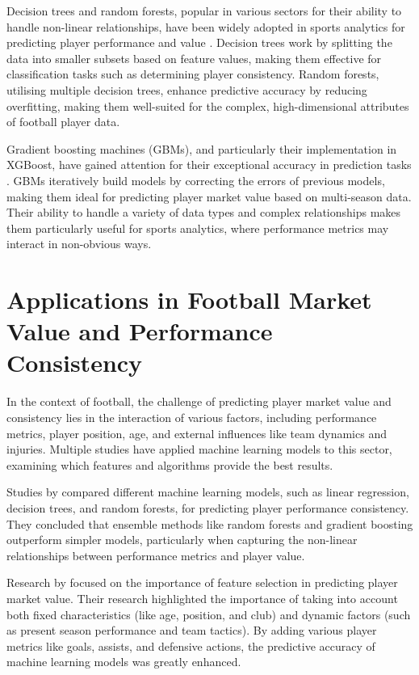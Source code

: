 \documentclass[12pt, a4paper,oneside]{book}
\numberwithin{equation}{section}
\begin{document}
Decision trees and random forests, popular in various sectors for their ability to handle non-linear relationships, have been widely adopted in sports analytics for predicting player performance and value \cite{breiman2001} \cite{friedman2001}. Decision trees work by splitting the data into smaller subsets based on feature values, making them effective for classification tasks such as determining player consistency. Random forests, utilising multiple decision trees, enhance predictive accuracy by reducing overfitting, making them well-suited for the complex, high-dimensional attributes of football player data.

Gradient boosting machines (GBMs), and particularly their implementation in XGBoost, have gained attention for their exceptional accuracy in prediction tasks \cite{chen2016}. GBMs iteratively build models by correcting the errors of previous models, making them ideal for predicting player market value based on multi-season data. Their ability to handle a variety of data types and complex relationships makes them particularly useful for sports analytics, where performance metrics may interact in non-obvious ways.

\section{Applications in Football Market Value and Performance Consistency}\label{sec:2.3}

In the context of football, the challenge of predicting player market value and consistency lies in the interaction of various factors, including performance metrics, player position, age, and external influences like team dynamics and injuries. Multiple studies have applied machine learning models to this sector, examining which features and algorithms provide the best results.

Studies by \cite{smith2018} compared different machine learning models, such as linear regression, decision trees, and random forests, for predicting player performance consistency. They concluded that ensemble methods like random forests and gradient boosting outperform simpler models, particularly when capturing the non-linear relationships between performance metrics and player value.

Research by \cite{zhangC2020} focused on the importance of feature selection in predicting player market value. Their research highlighted the importance of taking into account both fixed characteristics (like age, position, and club) and dynamic factors (such as present season performance and team tactics). By adding various player metrics like goals, assists, and defensive actions, the predictive accuracy of machine learning models was greatly enhanced.
\end{document}

